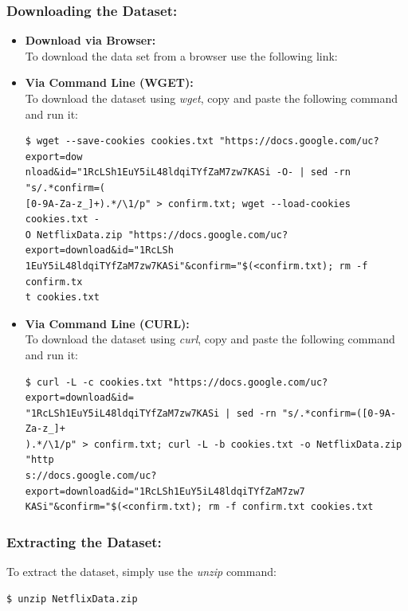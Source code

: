 \documentclass{article}
\begin{document}
\subsubsection*{Downloading the Dataset:}
\begin{itemize}
    \item \textbf{Download via Browser:}\\
        To download the data set from a browser use the following link:
        \begin{center}
        \href{https://drive.google.com/uc?export=download&id=1RcLSh1EuY5iL48ldqiTYfZaM7zw7KASi}{\color{blue}{https://drive.google.com/uc?export=download\&id=1RcLSh1EuY5iL48ldqiTYfZaM7zw7KASi}}
        \end{center}
    \item \textbf{Via Command Line (WGET):}\\
        To download the dataset using \textit{wget}, copy and paste the following command and run it:
        \begin{commandline}\begin{verbatim}$ wget --save-cookies cookies.txt "https://docs.google.com/uc?export=dow
nload&id="1RcLSh1EuY5iL48ldqiTYfZaM7zw7KASi -O- | sed -rn "s/.*confirm=(
[0-9A-Za-z_]+).*/\1/p" > confirm.txt; wget --load-cookies cookies.txt -
O NetflixData.zip "https://docs.google.com/uc?export=download&id="1RcLSh
1EuY5iL48ldqiTYfZaM7zw7KASi"&confirm="$(<confirm.txt); rm -f confirm.tx
t cookies.txt\end{verbatim}\end{commandline}
    \item \textbf{Via Command Line (CURL):}\\
        To download the dataset using \textit{curl}, copy and paste the following command and run it:
        \begin{commandline}\begin{verbatim}$ curl -L -c cookies.txt "https://docs.google.com/uc?export=download&id=
"1RcLSh1EuY5iL48ldqiTYfZaM7zw7KASi | sed -rn "s/.*confirm=([0-9A-Za-z_]+
).*/\1/p" > confirm.txt; curl -L -b cookies.txt -o NetflixData.zip "http
s://docs.google.com/uc?export=download&id="1RcLSh1EuY5iL48ldqiTYfZaM7zw7
KASi"&confirm="$(<confirm.txt); rm -f confirm.txt cookies.txt\end{verbatim}
\end{commandline}
\end{itemize}

\subsubsection*{Extracting the Dataset:}
To extract the dataset, simply use the \textit{unzip} command:
\begin{commandline}\begin{verbatim}$ unzip NetflixData.zip\end{verbatim}\end{commandline}
\end{document}
